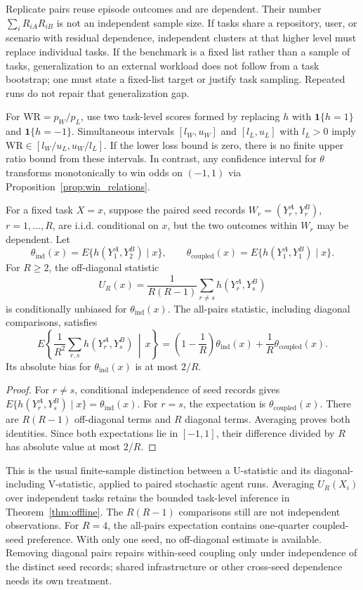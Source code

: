 Replicate pairs reuse episode outcomes and are dependent. Their number
$\sum_iR_{iA}R_{iB}$ is not an independent sample size. If tasks share a
repository, user, or scenario with residual dependence, independent
clusters at that higher level must replace individual tasks. If the
benchmark is a fixed list rather than a sample of tasks, generalization
to an external workload does not follow from a task bootstrap; one must
state a fixed-list target or justify task sampling. Repeated runs do not
repair that generalization gap.

For $\mathrm{WR}=p_W/p_L$, use two task-level scores formed by replacing
$h$ with $\mathbf1\{h=1\}$ and $\mathbf1\{h=-1\}$. Simultaneous
intervals $[l_W,u_W]$ and $[l_L,u_L]$ with $l_L>0$ imply
$\mathrm{WR}\in[l_W/u_L,u_W/l_L]$. If the lower loss bound is zero,
there is no finite upper ratio bound from these intervals. In contrast,
any confidence interval for $\theta$ transforms monotonically to win
odds on $(-1,1)$ via Proposition~\ref{prop:win_relations}.

\begin{lemma}
\label{lem:shared_seed}
For a fixed task $X=x$, suppose the paired seed records
$W_r=(Y_r^A,Y_r^B)$, $r=1,\ldots,R$, are i.i.d. conditional on $x$,
but the two outcomes within $W_r$ may be dependent. Let
\[
 \theta_{\mathrm{ind}}(x)
 =E\{h(Y_1^A,Y_2^B)\mid x\},\qquad
 \theta_{\mathrm{coupled}}(x)
 =E\{h(Y_1^A,Y_1^B)\mid x\}.
\]
For $R\geq2$, the off-diagonal statistic
\[
 U_R(x)=\frac1{R(R-1)}\sum_{r\ne s}h(Y_r^A,Y_s^B)
\]
is conditionally unbiased for $\theta_{\mathrm{ind}}(x)$.
The all-pairs statistic, including diagonal comparisons, satisfies
\[
 E\!\left\{\frac1{R^2}\sum_{r,s}h(Y_r^A,Y_s^B)\,\middle|\,x\right\}
 =\left(1-\frac1R\right)\theta_{\mathrm{ind}}(x)
       +\frac1R\theta_{\mathrm{coupled}}(x).
\]
Its absolute bias for $\theta_{\mathrm{ind}}(x)$ is at most $2/R$.
\end{lemma}
\begin{proof}
For $r\ne s$, conditional independence of seed records gives
$E\{h(Y_r^A,Y_s^B)\mid x\}=\theta_{\mathrm{ind}}(x)$.
For $r=s$, the expectation is
$\theta_{\mathrm{coupled}}(x)$. There are $R(R-1)$ off-diagonal
terms and $R$ diagonal terms. Averaging proves both identities. Since
both expectations lie in $[-1,1]$, their difference divided by $R$
has absolute value at most $2/R$.
\end{proof}

This is the usual finite-sample distinction between a U-statistic and
its diagonal-including V-statistic, applied to paired stochastic agent
runs. Averaging $U_R(X_i)$ over independent tasks retains the bounded
task-level inference in Theorem~\ref{thm:offline}. The
$R(R-1)$ comparisons still are not independent observations.
For $R=4$, the all-pairs expectation contains one-quarter coupled-seed
preference. With only one seed, no off-diagonal estimate is available.
Removing diagonal pairs repairs within-seed coupling only under
independence of the distinct seed records; shared infrastructure or
other cross-seed dependence needs its own treatment.


